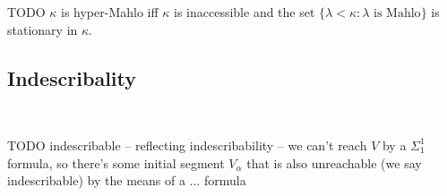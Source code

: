 \documentclass[12pt,a4paper]{article}
\newtheorem{theorem}{Theorem}[section]
\newenvironment{proof}
{\noindent \textit{Proof.}}
{\hspace*{\fill} $\Box$}
\renewcommand{\iff}{\leftrightarrow}
\newcommand{\then}{\rightarrow}
\begin{document}
{\color{red}
\begin{comment}

\begin{theorem}\label{th:refl_mahlo}
$\kappa$ is Mahlo $\iff$ for any $R \subset V_\kappa$ there is an inaccessible cardinal $\alpha < \kappa$ such that $\langle V_\alpha, \in, R \cap V_\alpha \rangle \prec \langle V_\kappa, \in, R \rangle$.
\end{theorem}

\begin{proof}
Start with the proof of (\ref{th:refl_inaccessible}) and add the following:\\
$\kappa$ is Mahlo by the following contradiction. If not, there would be a~$C$ closed unbounded in $\kappa$ containing no inaccessible cardinals. By the hypothesis there is in inaccessible $\alpha < \kappa$ such that $\langle V_\alpha, \in, C \cap V_\alpha \rangle \prec \langle V_\kappa, \in, C \rangle$. By elementarity $C \cap \alpha$ is unbounded in $\alpha$. But then, $\alpha \in C$, which is the contradiction we need.
\end{proof}

\

\end{comment}
}

TODO $\kappa$ is hyper-Mahlo iff $\kappa$ is inaccessible and the set $\{\lambda < \kappa : \lambda\mbox{ is Mahlo}\}$ is stationary in $\kappa$.





\subsection{Indescribality} %

\

TODO indescribable -- reflecting indescribability -- we can't reach $V$ by a $\Sigma_1^1$ formula, so there's some initial segment $V_\alpha$ that is also unreachable (we say indescribable) by the means of a ... formula
\end{document}
